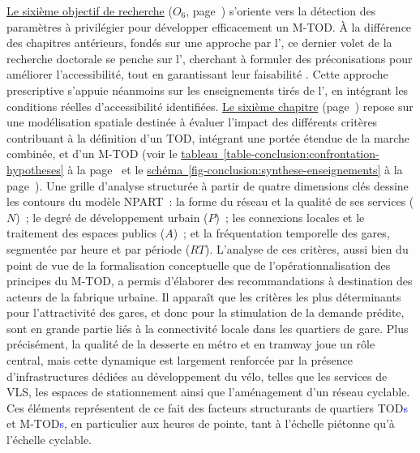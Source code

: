 \begin{refsegment}
\hyperref[objectif-6]{Le sixième objectif de recherche} (\(O_6\), page~\pageref{objectif-6}) s'oriente vers la détection des paramètres à privilégier pour développer efficacement un \acrfull{M-TOD}. À la différence des chapitres antérieurs, fondés sur une approche par l', ce dernier volet de la recherche doctorale se penche sur l', cherchant à formuler des préconisations pour améliorer l’accessibilité, tout en garantissant leur faisabilité \textcolor{blue}{\autocite[19]{levine_mobility_2019}}. Cette approche prescriptive s’appuie néanmoins sur les enseignements tirés de l’, en intégrant les conditions réelles d’accessibilité identifiées. \hyperref[chap6:titre]{Le sixième chapitre} (page~\pageref{chap6:titre}) repose sur une modélisation spatiale destinée à évaluer l’impact des différents critères contribuant à la définition d’un \acrshort{TOD}, intégrant une portée étendue de la marche combinée, et d'un \acrshort{M-TOD} (voir le \hyperref[table-conclusion:confrontation-hypotheses]{tableau~\ref{table-conclusion:confrontation-hypotheses}} à la page~\pageref{table-conclusion:confrontation-hypotheses} et le \hyperref[fig-conclusion:synthese-enseignements]{schéma~\ref{fig-conclusion:synthese-enseignements}} à la page~\pageref{fig-conclusion:synthese-enseignements}). Une grille d'analyse structurée à partir de quatre dimensions clés dessine les contours du modèle \acrfull{NPART}~: la forme du réseau et la qualité de ses services (\(N\))~; le degré de développement urbain (\(P\))~; les connexions locales et le traitement des espaces publics (\(A\))~; et la fréquentation temporelle des gares, segmentée par heure et par période (\(RT\)). L’analyse de ces critères, aussi bien du point de vue de la formalisation conceptuelle que de l’opérationnalisation des principes du \acrshort{M-TOD}, a permis d’élaborer des recommandations à destination des acteurs de la fabrique urbaine. Il apparaît que les critères les plus déterminants pour l’attractivité des gares, et donc pour la stimulation de la demande prédite, sont en grande partie liés à la connectivité locale dans les quartiers de gare. Plus précisément, la qualité de la desserte en métro et en tramway joue un rôle central, mais cette dynamique est largement renforcée par la présence d’infrastructures dédiées au développement du vélo, telles que les services de \acrfull{VLS}, les espaces de stationnement ainsi que l'aménagement d'un réseau cyclable. Ces éléments représentent de ce fait des facteurs structurants de quartiers \acrshort{TOD}\textcolor{blue}{s} et \acrshort{M-TOD}\textcolor{blue}{s}, en particulier aux heures de pointe, tant à l’échelle piétonne qu’à l’échelle cyclable.%


\end{refsegment}
